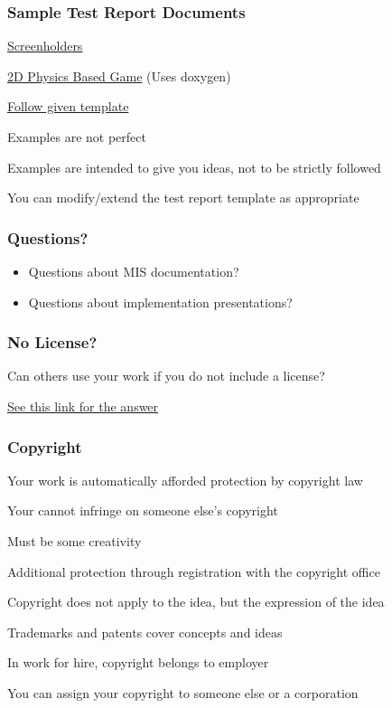 \documentclass[t,12pt,numbers,fleqn]{beamer}
\begin{document}
\begin{frame}
\frametitle{Sample Test Report Documents} 

\bi
\item
  \href{https://gitlab.cas.mcmaster.ca/screenholders/screenholders}{Screenholders}
\item
  \href{https://github.com/palmerst/CS-4ZP6/tree/master}{2D Physics Based Game}
  (Uses doxygen)
\item
  \href{https://gitlab.cas.mcmaster.ca/smiths/cas741/tree/master/BlankProjectTemplate/Doc/TestReport}{Follow given template}
\item Examples are not perfect
\item Examples are intended to give you ideas, not to be strictly followed
\item You can modify/extend the test report template as appropriate
\ei

\end{frame}


\begin{frame}
\frametitle{Questions?}
\begin{itemize}
\item Questions about MIS documentation?
\item Questions about implementation presentations?
\end{itemize}
\end{frame}


\begin{frame}
\frametitle{No License?}

\bi
\item Can others use your work if you do not include a license?
\item \href{http://choosealicense.com/no-license/}{See this link for the answer}
\ei

\end{frame}


\begin{frame}
\frametitle{Copyright}

\bi
\item Your work is automatically afforded protection by copyright law
\bi
\item Your cannot infringe on someone else's copyright
\item Must be some creativity
\ei
\item Additional protection through registration with the copyright office
\item Copyright does not apply to the idea, but the expression of the idea
\item Trademarks and patents cover concepts and ideas
\item In work for hire, copyright belongs to employer
\item You can assign your copyright to someone else or a corporation
\ei

\end{frame}
\end{document}
